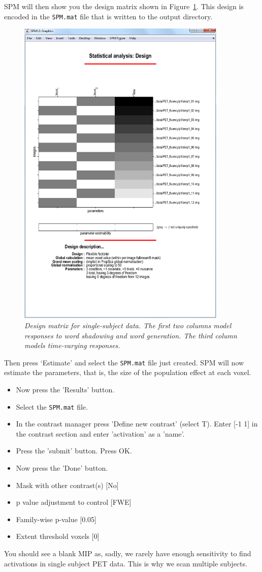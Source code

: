 SPM will then show you the design matrix shown in Figure~\ref{single_design}. This design is encoded in the \texttt{SPM.mat} file that is written to the output directory.
\begin{figure}
\begin{center}
\includegraphics[width=100mm]{pet/single_design}
\caption{\em Design matrix for single-subject data. The first two columns model responses to word shadowing and word generation. The third column models time-varying responses. \label{single_design}}
\end{center}
\end{figure}
Then press `Estimate' and select the \texttt{SPM.mat} file just created. SPM will now estimate the parameters, that is, the size of the population effect at each voxel.
\begin{itemize}
\item{Now press the 'Results' button.}
\item{Select the \texttt{SPM.mat} file.}
\item{In the contrast manager press 'Define new contrast' (select T). Enter [-1 1] in the contrast section and enter 'activation' as a 'name'.}
\item{Press the 'submit' button. Press OK.}
\item{Now press the 'Done' button.}
\item{Mask with other contrast(s) [No]}
\item{p value adjustment to control [FWE]}
\item{Family-wise p-value [0.05]}
\item{Extent threshold {voxels} [0]}
\end{itemize}
You should see a blank MIP as, sadly, we rarely have enough sensitivity to find activations in single subject PET data. This is why we scan multiple subjects.

